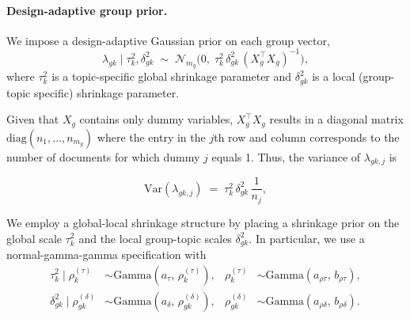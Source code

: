 \paragraph{Design-adaptive group prior.}
We impose a design-adaptive Gaussian prior on each
group vector,
\begin{equation}
\label{eq:gprior_group}
\lambda_{gk}\mid \tau_k^2,\delta_{gk}^2 \;\sim\;
\mathcal N_{m_g}\!\Big(0,\; \tau_k^2\,\delta_{gk}^2\, (X_g^\top X_g)^{-1}\Big),
\end{equation}
where $\tau_k^2$ is a topic-specific global shrinkage parameter and $\delta_{gk}^2$ is a local
(group-topic specific) shrinkage parameter. 


Given that $X_g$ contains only dummy variables, $X_g^{\top}X_g$ results in a diagonal matrix $\text{diag}(n_1, \ldots, n_{m_g})$ where the entry in the $j$th row and column corresponds to the number of documents for which dummy $j$ equals 1. Thus, the variance of $\lambda_{gk,j}$ is

\begin{equation}
\label{eq:dummy_variance_scaling}
\mathrm{Var}\!\left(\lambda_{gk,j}\right)
\;=\;
\tau_k^2\,\delta_{gk}^2\,\frac{1}{n_j},
\end{equation}


We employ a global-local shrinkage structure by placing a shrinkage prior on the
global scale $\tau_k^2$ and the local group-topic scales $\delta_{gk}^2$. In particular, we use a normal-gamma-gamma specification with
\begin{align}
\tau^2_k \mid \rho_k^{(\tau)} &\sim \mathrm{Gamma}\!\left(a_{\tau},\, \rho_k^{(\tau)}\right),
&
\rho_k^{(\tau)} &\sim \mathrm{Gamma}\!\left(a_{\rho\tau},\, b_{\rho\tau}\right),
\label{eq:triple_gamma_tau}
\\
\delta^2_{gk} \mid \rho_{gk}^{(\delta)} &\sim \mathrm{Gamma}\!\left(a_{\delta},\, \rho_{gk}^{(\delta)}\right),
&
\rho_{gk}^{(\delta)} &\sim \mathrm{Gamma}\!\left(a_{\rho\delta},\, b_{\rho\delta}\right).
\label{eq:triple_gamma_delta}
\end{align}

